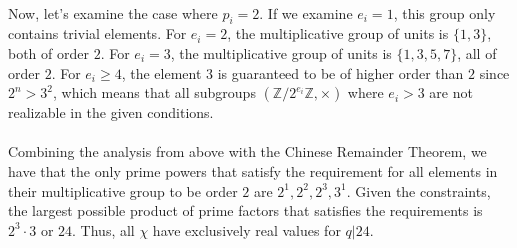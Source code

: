 \\
Now, let's examine the case where $p_i = 2$. 
If we examine $e_i = 1$, this group only contains trivial elements. 
For $e_i = 2$, the multiplicative group of units is $\{1, 3\}$, both of order $2$. 
For $e_i = 3$, the multiplicative group of units is $\{1, 3, 5, 7\}$, all of order $2$. 
For $e_i \geq 4$, the element $3$ is guaranteed to be of higher order than $2$ since $2^n > 3^2$, which means that all subgroups $\left(\mathbb{Z}/2^{e_i}\mathbb{Z}, \times\right)$ where $e_i > 3$ are not realizable in the given conditions.\\ 
\\
Combining the analysis from above with the Chinese Remainder Theorem, we have that the only prime powers that satisfy the requirement for all elements in their multiplicative group to be order $2$ are $2^1, 2^2, 2^3, 3^1$. Given the constraints, the largest possible product of prime factors that satisfies the requirements is $2^3 \cdot 3$ or $24$. Thus, all $\chi$ have exclusively real values for $q | 24$. 
